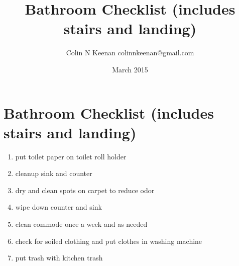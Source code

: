 \documentclass[12pt,letterpaper]{article}
\newcommand{\mytitle}{Bathroom Checklist (includes stairs and landing)}
\begin{document}
\title{\mytitle{}}
\author{Colin N Keenan colinnkeenan@gmail.com}
\date{March 2015}
\section*{\mytitle{}}
\begin{enumerate}
	\item put toilet paper on toilet roll holder
	\item cleanup sink and counter
	\item dry and clean spots on carpet to reduce odor
	\item wipe down counter and sink
	\item clean commode once a week and as needed
	\item check for soiled clothing and put clothes in washing machine
	\item put trash with kitchen trash
\end{enumerate}
\end{document}
